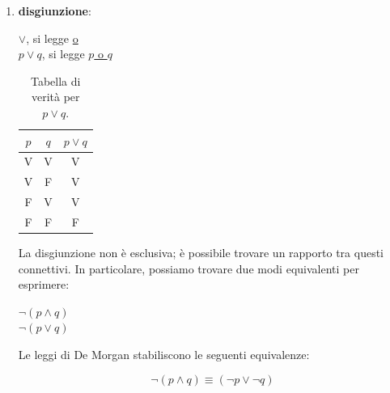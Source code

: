 \begin{enumerate}
            \item \textbf{disgiunzione}: 
               \begin{flushleft}
                    \(\lor\), si legge \underline{o} \\
                    \( p \lor q \), si legge \underline{\( p \) o \( q \)}
                \end{flushleft}
                
                \begin{table}[h!]
                    \centering
                    \begin{tabular}{|c|c|c|}
                        \hline
                        $p$ & $q$ & $p \lor q$ \\
                        \hline
                        V & V & V \\
                        V & F & V \\
                        F & V & V \\
                        F & F & F \\
                        \hline
                    \end{tabular}
                    \caption{Tabella di verità per \( p \lor q \).}
                \end{table}
                
                \newpage
                
                La disgiunzione non è esclusiva; è possibile trovare un rapporto tra questi connettivi. In particolare, possiamo trovare due modi equivalenti per esprimere:
                
                \begin{center}
                    \(\neg (p \land q)\) \\
                    \(\neg (p \lor q)\)
                \end{center}
                
                Le leggi di De Morgan stabiliscono le seguenti equivalenze:
                
                \[\neg (p \land q) \equiv (\neg p \lor \neg q)\]
                

\end{enumerate}
